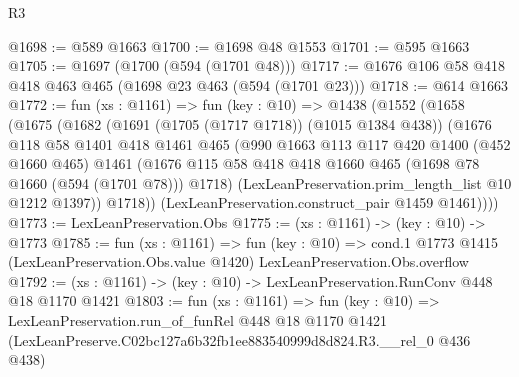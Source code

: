 \begin{lexlean}{R3}
\begin{coremodule}
@1698 := @589 @1663
@1700 := @1698 @48 @1553
@1701 := @595 @1663
@1705 := @1697 (@1700 (@594 (@1701 @48)))
@1717 := @1676 @106 @58 @418 @418 @463 @465 (@1698 @23 @463 (@594 (@1701 @23)))
@1718 := @614 @1663
@1772 := fun (xs : @1161) =>
  fun (key : @10) =>
  @1438
    (@1552
      (@1658
        (@1675
          (@1682
            (@1691 (@1705 (@1717 @1718)) (@1015 @1384 @438))
            (@1676
              @118
              @58
              @1401
              @418
              @1461
              @465
              (@990
                @1663
                @113
                @117
                @420
                @1400
                (@452 @1660 @465)
                @1461
                (@1676 @115 @58 @418 @418 @1660 @465 (@1698 @78 @1660 (@594 (@1701 @78))) @1718)
                (LexLeanPreservation.prim_length_list @10 @1212 @1397))
              @1718))
          (LexLeanPreservation.construct_pair @1459 @1461))))
@1773 := LexLeanPreservation.Obs
@1775 := (xs : @1161) -> (key : @10) -> @1773
@1785 := fun (xs : @1161) =>
  fun (key : @10) =>
  cond.{1} @1773 @1415 (LexLeanPreservation.Obs.value @1420) LexLeanPreservation.Obs.overflow
@1792 := (xs : @1161) -> (key : @10) -> LexLeanPreservation.RunConv @448 @18 @1170 @1421
@1803 := fun (xs : @1161) =>
  fun (key : @10) =>
  LexLeanPreservation.run_of_funRel
    @448
    @18
    @1170
    @1421
    (LexLeanPreserve.C02bc127a6b32fb1ee883540999d8d824.R3.__rel_0 @436 @438)
\end{coremodule}
\end{lexlean}
